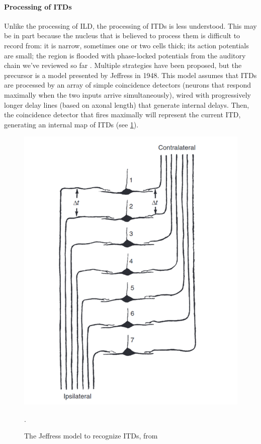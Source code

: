 \documentclass[11pt,a4paper]{article}
\begin{document}
\paragraph{Processing of ITDs}
Unlike the processing of ILD, the processing of ITDs is less understood. This may be in part because the nucleus that is believed to process them is difficult to record from: it is narrow, sometimes one or two cells thick; its action potentials are small; the region is flooded with phase-locked potentials from the auditory chain we've reviewed so far \cite{scottPosthearingDevelopmentalRefinement2005a}.  Multiple strategies have been proposed, but the precursor is a model presented by Jeffress in 1948. This model assumes that ITDs are processed by an array of simple coincidence detectors (neurons that respond maximally when the two inputs arrive simultaneously), wired with progressively longer delay lines (based on axonal length) that generate internal delays. Then, the coincidence detector that fires maximally will represent the current ITD, generating an internal map of ITDs (see \ref{fig:jeffress}).
\begin{figure}[H]
    \centering
    \includegraphics[width=0.5\linewidth]{Images/yin-1526.png}
    \caption{The Jeffress model to recognize ITDs, from \cite{yinNeuralMechanismsBinaural2019}}.
    \label{fig:jeffress}
\end{figure}
\end{document}

